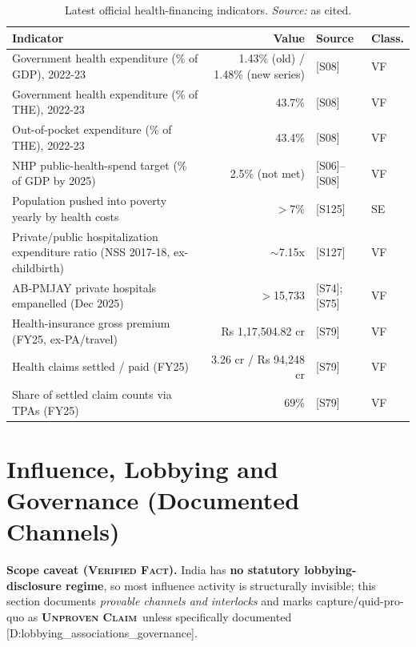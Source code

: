 \documentclass[11pt,a4paper]{article}
\newcommand{\VF}{\textcolor{vfcol}{\textsc{\textbf{Verified Fact}}}}
\newcommand{\UC}{\textcolor{uccol}{\textsc{\textbf{Unproven Claim}}}}
\newcommand{\cs}[1]{\textnormal{[#1]}}
\begin{document}
\begin{table}[htbp]
\centering
\small
\caption{Latest official health-financing indicators. \textit{Source:} as cited.}
\label{tab:financing}
\begin{tabularx}{\textwidth}{@{}>{\raggedright\arraybackslash}X r >{\raggedright\arraybackslash}p{2.0cm} l@{}}
\toprule
\textbf{Indicator} & \textbf{Value} & \textbf{Source} & \textbf{Class.} \\
\midrule
Government health expenditure (\% of GDP), 2022-23 & 1.43\% (old) / 1.48\% (new series) & \cs{S08} & VF \\
Government health expenditure (\% of THE), 2022-23 & 43.7\% & \cs{S08} & VF \\
Out-of-pocket expenditure (\% of THE), 2022-23 & 43.4\% & \cs{S08} & VF \\
NHP public-health-spend target (\% of GDP by 2025) & 2.5\% (not met) & \cs{S06}--\cs{S08} & VF \\
Population pushed into poverty yearly by health costs & $>$7\% & \cs{S125} & SE \\
Private/public hospitalization expenditure ratio (NSS 2017-18, ex-childbirth) & $\sim$7.15x & \cs{S127} & VF \\
AB-PMJAY private hospitals empanelled (Dec 2025) & $>$15{,}733 & \cs{S74}; \cs{S75} & VF \\
Health-insurance gross premium (FY25, ex-PA/travel) & Rs 1{,}17{,}504.82 cr & \cs{S79} & VF \\
Health claims settled / paid (FY25) & 3.26 cr / Rs 94{,}248 cr & \cs{S79} & VF \\
Share of settled claim counts via TPAs (FY25) & 69\% & \cs{S79} & VF \\
\bottomrule
\end{tabularx}
\end{table}

\section{Influence, Lobbying and Governance (Documented Channels)}\label{sec:influence}
\textbf{Scope caveat (\VF).} India has \textbf{no statutory lobbying-disclosure regime}, so most influence activity is structurally invisible; this section documents \emph{provable channels and interlocks} and marks capture/quid-pro-quo as \UC\ unless specifically documented \cs{D:lobbying\_associations\_governance}.
\end{document}
